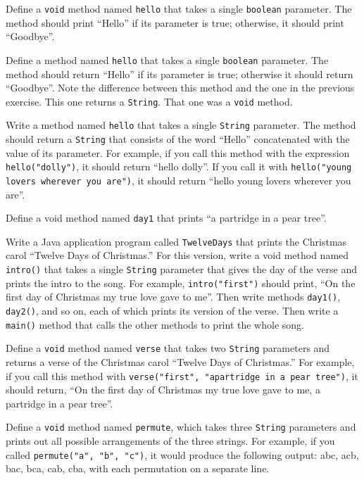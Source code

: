 \begin{EXRtwo}
\item  Define a {\tt void} method named {\tt hello} that takes a
single {\tt boolean} parameter.  The method should print ``Hello''
if its parameter is true; otherwise, it should print ``Goodbye''.


\item  Define a method named {\tt hello} that takes a
single {\tt boolean} parameter.  The method should return ``Hello'' if
its parameter is true; otherwise it should return ``Goodbye''.  Note the
difference between this method and the one in the previous
exercise.  This one returns a {\tt String}. That one was a {\tt void}
method.

\item  Write a  method named {\tt hello} that takes a
single {\tt String} parameter.  The method should return a {\tt String}
that consists of the word ``Hello'' concatenated with the value of its
parameter.  For example, if you call this method with the expression
{\tt hello("dolly")}, it should return ``hello dolly''. If you call it
with {\tt hello("young lovers wherever you are")}, it should return
``hello young lovers wherever you are''.

\item  Define a void method named {\tt day1} that prints
``a partridge in a pear tree''.

\item  Write a Java application program called {\tt TwelveDays}
that prints the Christmas carol ``Twelve Days of Christmas.'' For this
version, write a void method named {\tt intro()} that takes a single
{\tt String} parameter that gives the day of the verse and prints the
intro to the song.  For example, {\tt intro("first")} should print, ``On
the first day of Christmas my true love gave to me''. Then write
methods {\tt day1()}, {\tt day2()}, and so on, each of which prints
its version of the verse.  Then write a {\tt main()} method that calls
the other methods to print the whole song.

\item  Define a {\tt void} method named {\tt verse} that takes
two {\tt String} parameters and returns a verse of the Christmas
carol ``Twelve Days of Christmas.'' For example, if you call this
method with {\tt verse("first", "a\break partridge in a pear tree")}, it
should return, ``On the first day of Christmas my true love gave to
me, a partridge in a pear tree''.

\item  Define a {\tt void} method named {\tt permute},
which takes three {\tt String} parameters and prints out all possible
arrangements of the three strings.  For example, if you called
{\tt permute("a", "b", "c")}, it would produce the following output: abc,
acb, bac, bca, cab, cba, with each permutation on a separate line.


\end{EXRtwo}
